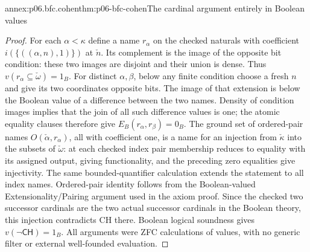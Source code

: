 \begin{annexitem}{annex:p06.bfc.cohen}{thm:p06-bfc-cohen}{The cardinal argument entirely in Boolean values}
\begin{proof}
For each \(\alpha<\kappa\) define a name \(r_\alpha\) on the checked
naturals with coefficient
\(i(\{((\alpha,n),1)\})\) at \(\check n\). Its complement is the
image of the opposite bit condition: these two images are disjoint and
their union is dense. Thus \(v(r_\alpha\subseteq\check\omega)=1_B\).
For distinct \(\alpha,\beta\), below any finite condition choose a fresh
\(n\) and give its two coordinates opposite bits. The image of that
extension is below the Boolean value of a difference between the two
names. Density of condition images implies that the join of all such
difference values is one; the atomic equality clauses therefore give
\(E_B(r_\alpha,r_\beta)=0_B\).
The ground set of ordered-pair names \(O(\check\alpha,r_\alpha)\),
all with coefficient one, is a name for an injection from
\(\check\kappa\) into the subsets of \(\check\omega\): at each
checked index pair membership reduces to equality with its assigned
output, giving functionality, and the preceding zero equalities give
injectivity. The same bounded-quantifier calculation extends the statement
to all index names. Ordered-pair identity follows from the Boolean-valued
Extensionality/Pairing argument used in the axiom proof.
Since the checked two successor cardinals are the two actual successor
cardinals in the Boolean theory, this injection contradicts CH there.
Boolean logical soundness gives \(v(\neg\mathsf{CH})=1_B\).
All arguments were ZFC calculations of values, with no generic filter
or external well-founded evaluation.
\end{proof}
\end{annexitem}

